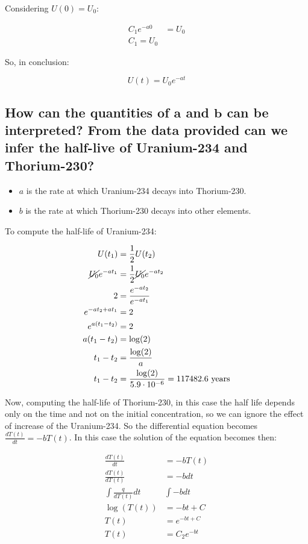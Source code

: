   Considering $U(0) = U_0$:

  \begin{align*}
    C_1e^{-a0} &= U_0\\
    C_1 = U_0
  \end{align*}

  So, in conclusion:

  $$U(t) = U_0e^{-at}$$

  \subsection{How can the quantities of $\mathbf{a}$ and $\mathbf{b}$ can be interpreted? From the data provided can we infer the half-live of Uranium-234 and Thorium-230?}

  \begin{multicols}{2}
    \begin{itemize}
      \item $a$ is the rate at which Uranium-234 decays into Thorium-230.
      \item $b$ is the rate at which Thorium-230 decays into other elements.
    \end{itemize}
  \end{multicols}

  To compute the half-life of Uranium-234:

  \begin{align*}
    U(t_1) &= \frac{1}{2}U(t_2)\\
    \cancel{U_0}e^{-at_1} &= \frac{1}{2}\cancel{U_0}e^{-at_2}\\
    2 &= \frac{e^{-a t_2}}{e^{-a t_1}}\\
    e^{-a t_2 + at_1} &= 2\\
    e^{a(t_1 - t_2)} &= 2\\
    a(t_1 - t_2) &= \log(2)\\
    t_1 - t_2 &= \frac{\log(2)}{a}\\
    t_1 - t_2 &= \frac{\log(2)}{5.9 \cdot 10^{-6}} = 117482.6\text{ years}\\
  \end{align*}

  Now, computing the half-life of Thorium-230, in this case the half life depends only on the time and not on the initial concentration, so we can ignore the effect of increase of the Uranium-234.
  So the differential equation becomes $\frac{dT(t)}{dt} = -bT(t)$.
  In this case the solution of the equation becomes then:

  \begin{align*}
    \frac{dT(t)}{dt} &= -bT(t) \\
    \frac{dT(t)}{dT(t)} &= -bdt \\
    \int \frac{q}{dT(t)}dt & \int -bdt \\
    \log(T(t)) &= -bt + C \\
    T(t) &= e^{-bt + C}\\
    T(t) &= C_2e^{-bt}
  \end{align*}

